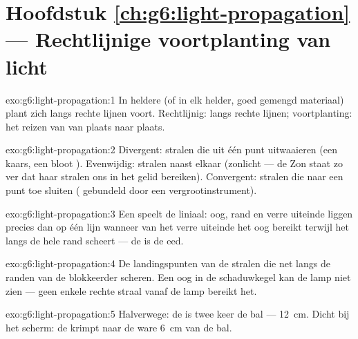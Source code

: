 \section*{Hoofdstuk \ref{ch:g6:light-propagation} --- Rechtlijnige voortplanting van licht}

\begin{solution}{exo:g6:light-propagation:1}
In heldere  (of in elk helder, goed gemengd materiaal) plant
 zich langs rechte lijnen voort. Rechtlijnig: langs rechte
lijnen; voortplanting: het reizen van  van plaats naar plaats.
\end{solution}

\begin{solution}{exo:g6:light-propagation:2}
Divergent: stralen die uit één punt uitwaaieren (een kaars, een bloot
). Evenwijdig: stralen naast elkaar (zonlicht --- de Zon staat
zo ver dat haar stralen ons in het gelid bereiken). Convergent:
stralen die naar een punt toe sluiten ( gebundeld door een
vergrootinstrument).
\end{solution}

\begin{solution}{exo:g6:light-propagation:3}
Een  speelt de liniaal: oog, rand en verre uiteinde liggen
precies dan op één lijn wanneer  van het verre uiteinde het oog
bereikt terwijl het langs de hele rand scheert --- de
 is de eed.
\end{solution}

\begin{solution}{exo:g6:light-propagation:4}
De landingspunten van de stralen die net langs de randen van de
blokkeerder scheren. Een oog in de schaduwkegel kan de lamp niet zien
--- geen enkele rechte straal vanaf de lamp bereikt het.
\end{solution}

\begin{solution}{exo:g6:light-propagation:5}
Halverwege: de  is twee keer de bal --- \qty{12}{cm}. Dicht bij
het scherm: de  krimpt naar de ware \qty{6}{cm} van de bal.
\end{solution}


